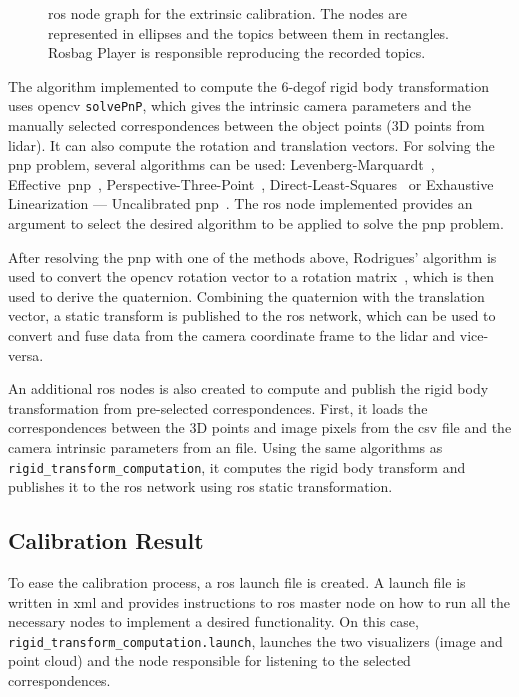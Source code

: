 \begin{figure}[!ht]
	\centering
	\def\svgwidth{\columnwidth}
	\graphicspath{{img/calibration/}}
	
	\caption{\ac{ros} node graph for the extrinsic calibration. The nodes are represented in  ellipses and the topics between them in rectangles. Rosbag Player is responsible reproducing the recorded topics.}
	\label{fig:extrinsic-calibration-rosgraph}
\end{figure}


The algorithm implemented to compute the 6-\ac{degof} rigid body transformation uses \ac{opencv} \texttt{solvePnP}, which gives the intrinsic camera parameters and the manually selected correspondences between the object points (3D points from \ac{lidar}). It can also compute the rotation and translation vectors. For solving the \ac{pnp} problem, several algorithms can be used: Levenberg-Marquardt~\cite{Levenberg1943}, Effective~\ac{pnp}~\cite{Lepetit2009}, Perspective-Three-Point~\cite{Gao2003}, Direct-Least-Squares~\cite{Hesch2011} or Exhaustive Linearization — Uncalibrated \ac{pnp}~\cite{Penate-Sanchez2013a}. The \ac{ros} node implemented provides an argument to select the desired algorithm to be applied to solve the \ac{pnp} problem.

After resolving the \ac{pnp} with one of the methods above, Rodrigues' algorithm is used to convert the \ac{opencv} rotation vector to a rotation matrix~\cite{Dai2015}, which is then used to derive the quaternion. Combining the quaternion with the translation vector, a static transform is published to the \ac{ros} network, which can be used to convert and fuse data from the camera coordinate frame to the \ac{lidar} and vice-versa.

An additional \ac{ros} nodes is also created to compute and publish the rigid body transformation from pre-selected correspondences. First, it loads the correspondences between the 3D points and image pixels from the \ac{csv} file and the camera intrinsic parameters from an  file. Using the same algorithms as \texttt{rigid\_transform\_computation}, it computes the rigid body transform and publishes it to the \ac{ros} network using \ac{ros} static transformation.


\subsection{Calibration Result}
\label{subsec:calibration:extrinsic-results}
To ease the calibration process, a \ac{ros} launch file is created. A launch file is written in \ac{xml} and provides instructions to \ac{ros} master node on how to run all the necessary nodes to implement a desired functionality. On this case, \texttt{rigid\_transform\_computation.launch}, launches the two visualizers (image and point cloud) and the node responsible for listening to the selected correspondences. 

